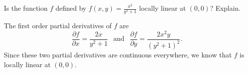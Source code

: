 \begin{activity} \label{A:10.4.3} Is the function $f$ defined by $f(x,y) = \frac{x^2}{y^2+1}$ locally linear at $(0,0)$? Explain.

\end{activity}
\begin{smallhint}

\end{smallhint}
\begin{bighint}

\end{bighint}
\begin{activitySolution}
The first order partial derivatives of $f$ are 
\[\frac{\partial f}{\partial x} = \frac{2x}{y^2+1} \ \ \text{ and } \ \ \frac{\partial f}{\partial y} = \frac{2x^2y}{(y^2+1)^2}.\]
Since these two partial derivatives are continuous everywhere, we know that $f$ is locally linear at $(0,0)$.  
\end{activitySolution}
\aftera
